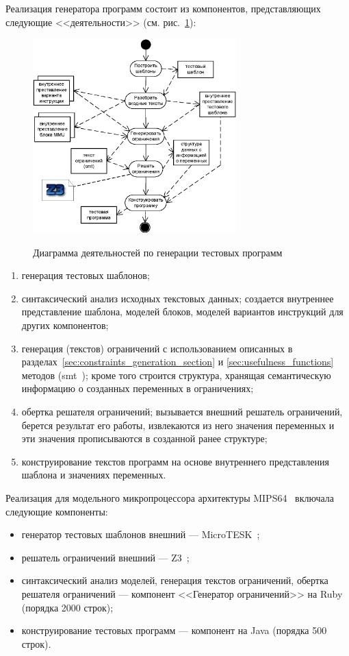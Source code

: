 Реализация генератора программ состоит из компонентов, представляющих следующие <<деятельности>> (см. рис.~\ref{fig:activities}):
\begin{figure}[h] \center
  \includegraphics[width=0.7\textwidth]{3.impl/activities1}\\
  \caption{Диаграмма деятельностей по генерации тестовых программ}\label{fig:activities}
\end{figure}
\begin{enumerate}
  \item генерация тестовых шаблонов;
  \item синтаксический анализ исходных текстовых данных; создается внутреннее представление шаблона, моделей блоков, моделей вариантов инструкций для других компонентов;
  \item генерация (текстов) ограничений с использованием описанных в разделах~\ref{sec:constraints_generation_section} и \ref{sec:usefulness_functions} методов (smt~\cite{SMT}); кроме того строится структура, хранящая семантическую информацию о созданных переменных в ограничениях;
  \item обертка решателя ограничений; вызывается внешний решатель ограничений, берется результат его работы, извлекаются из него значения переменных и эти значения прописываются в созданной ранее структуре;
  \item конструирование текстов программ на основе внутреннего представления шаблона и значениях переменных.
\end{enumerate}

Реализация для модельного микропроцессора архитектуры MIPS64~\cite{mips64II} включала следующие компоненты:
\begin{itemize}
  \item генератор тестовых шаблонов внешний --- MicroTESK~\cite{MicroTESK};
  \item решатель ограничений внешний --- Z3~\cite{Z3};
  \item синтаксический анализ моделей, генерация текстов ограничений, обертка решателя ограничений --- компонент <<Генератор ограничений>> на Ruby (порядка 2000 строк);
  \item конструирование тестовых программ --- компонент на Java (порядка 500 строк).
\end{itemize}

